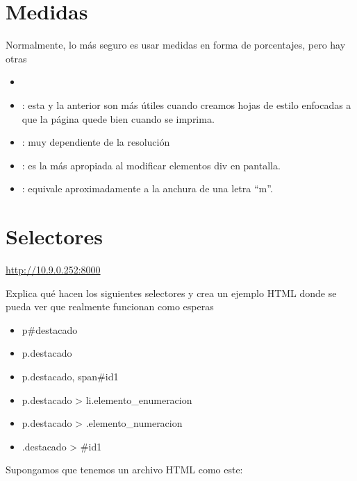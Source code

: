 \documentclass[letterpaper,10pt,spanish]{sphinxmanual}
\begin{document}
\section{Medidas}
\label{tema3:medidas}
Normalmente, lo más seguro es usar medidas en forma de porcentajes, pero hay otras
\begin{itemize}
\item {} 

\item {} 
: esta y la anterior son más útiles cuando creamos hojas de estilo enfocadas a que la página quede bien cuando se imprima.

\item {} 
: muy dependiente de la resolución

\item {} 
: es la más apropiada al modificar elementos div en pantalla.

\item {} 
: equivale aproximadamente a la anchura de una letra ``m''.

\end{itemize}


\section{Selectores}
\label{tema3:selectores}
\url{http://10.9.0.252:8000}

Explica qué hacen los siguientes selectores y crea un ejemplo HTML donde se pueda ver que realmente funcionan como esperas
\begin{itemize}
\item {} 
p\#destacado

\item {} 
p.destacado

\item {} 
p.destacado, span\#id1

\item {} 
p.destacado \textgreater{} li.elemento\_enumeracion

\item {} 
p.destacado \textgreater{} .elemento\_numeracion

\item {} 
.destacado \textgreater{} \#id1

\end{itemize}

Supongamos que tenemos un archivo HTML como este:
\end{document}
